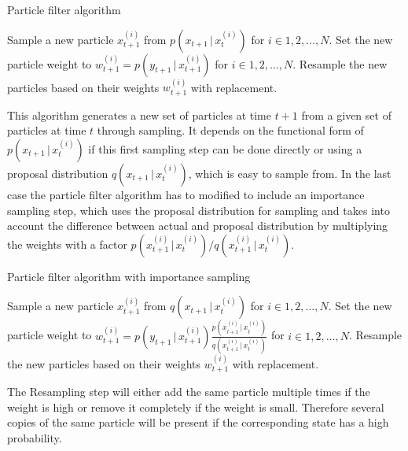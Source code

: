 \documentclass{tstextbook}
\begin{document}
\begin{algorithm}
\caption{Particle filter algorithm}
\begin{algorithmic}[1]
\State Sample a new particle $x^{(i)}_{t+1}$ from $p\left(x_{t+1}\,\vert\,x^{(i)}_{t}\right)$ for $i\in 1,2,\ldots,N$. 
\State Set the new particle weight to $w^{(i)}_{t+1} = p\left(y_{t+1}\,\vert\, x^{(i)}_{t+1}\right)$ for $i\in 1,2,\ldots,N$.
\State Resample the new particles based on their weights $w^{(i)}_{t+1}$ with replacement. 
\end{algorithmic}
\end{algorithm}

This algorithm generates a new set of particles at time $t+1$ from a given set of particles at time $t$ through sampling. It depends on the functional form of $p\left(x_{t+1}\,\vert\,x^{(i)}_{t}\right)$ if this first sampling step can be done directly or using a proposal distribution $q\left(x_{t+1}\,\vert\,x^{(i)}_{t}\right)$, which is easy to sample from. In the last case the particle filter algorithm has to modified to include an importance sampling step, which uses the proposal distribution for sampling and takes into account the difference between actual and proposal distribution by multiplying the weights with a factor 
$p\left(x^{(i)}_{t+1}\,\vert\,x^{(i)}_{t}\right)/q\left(x^{(i)}_{t+1}\,\vert\,x^{(i)}_{t}\right)$.   

\begin{algorithm}
\caption{Particle filter algorithm with importance sampling}
\begin{algorithmic}[1]
\State Sample a new particle $x^{(i)}_{t+1}$ from $q\left(x_{t+1}\,\vert\,x^{(i)}_{t}\right)$ for $i\in 1,2,\ldots,N$.
\State Set the new particle weight to $w^{(i)}_{t+1} = p\left(y_{t+1}\,\vert\, x^{(i)}_{t+1}\right)\frac{p\left(x^{(i)}_{t+1}\,\vert\,x^{(i)}_{t}\right)}{q\left(x^{(i)}_{t+1}\,\vert\,x^{(i)}_{t}\right)}$ for $i\in 1,2,\ldots,N$. 
\State Resample the new particles based on their weights $w^{(i)}_{t+1}$ with replacement. 
\end{algorithmic}
\end{algorithm}   

The Resampling step will either add the same particle multiple times if the weight is high or remove it completely if the weight is small. Therefore several copies of the same particle will be present if the corresponding state has a high probability.
\end{document}
